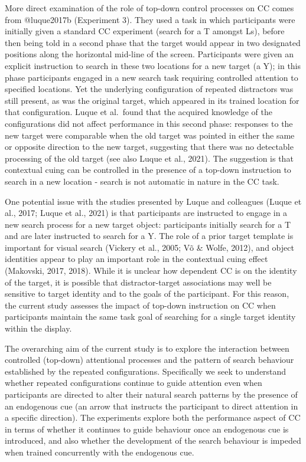\documentclass[
  man,
  floatsintext,
  longtable,
  nolmodern,
  notxfonts,
  notimes,
  colorlinks=true,linkcolor=blue,citecolor=blue,urlcolor=blue]{apa7}
\begin{document}
More direct examination of the role of top-down control processes on CC
comes from @luque2017b (Experiment 3). They used a task in which
participants were initially given a standard CC experiment (search for a
T amongst Ls), before then being told in a second phase that the target
would appear in two designated positions along the horizontal mid-line
of the screen. Participants were given an explicit instruction to search
in these two locations for a new target (a Y); in this phase
participants engaged in a new search task requiring controlled attention
to specified locations. Yet the underlying configuration of repeated
distractors was still present, as was the original target, which
appeared in its trained location for that configuration. Luque et
al.~found that the acquired knowledge of the configurations did not
affect performance in this second phase: responses to the new target
were comparable when the old target was pointed in either the same or
opposite direction to the new target, suggesting that there was no
detectable processing of the old target (see also Luque et al., 2021).
The suggestion is that contextual cuing can be controlled in the
presence of a top-down instruction to search in a new location - search
is not automatic in nature in the CC task.

One potential issue with the studies presented by Luque and colleagues
(Luque et al., 2017; Luque et al., 2021) is that participants are
instructed to engage in a new search process for a new target object:
participants initially search for a T and are later instructed to search
for a Y. The role of a prior target template is important for visual
search (Vickery et al., 2005; Võ \& Wolfe, 2012), and object identities
appear to play an important role in the contextual cuing effect
(Makovski, 2017, 2018). While it is unclear how dependent CC is on the
identity of the target, it is possible that distractor-target
associations may well be sensitive to target identity and to the goals
of the participant. For this reason, the current study assesses the
impact of top-down instruction on CC when participants maintain the same
task goal of searching for a single target identity within the display.

The overarching aim of the current study is to explore the interaction
between controlled (top-down) attentional processes and the pattern of
search behaviour established by the repeated configurations.
Specifically we seek to understand whether repeated configurations
continue to guide attention even when participants are directed to alter
their natural search patterns by the presence of an endogenous cue (an
arrow that instructs the participant to direct attention in a specific
direction). The experiments explore both the performance aspect of CC in
terms of whether it continues to guide behaviour once an endogenous cue
is introduced, and also whether the development of the search behaviour
is impeded when trained concurrently with the endogenous cue.
\end{document}
